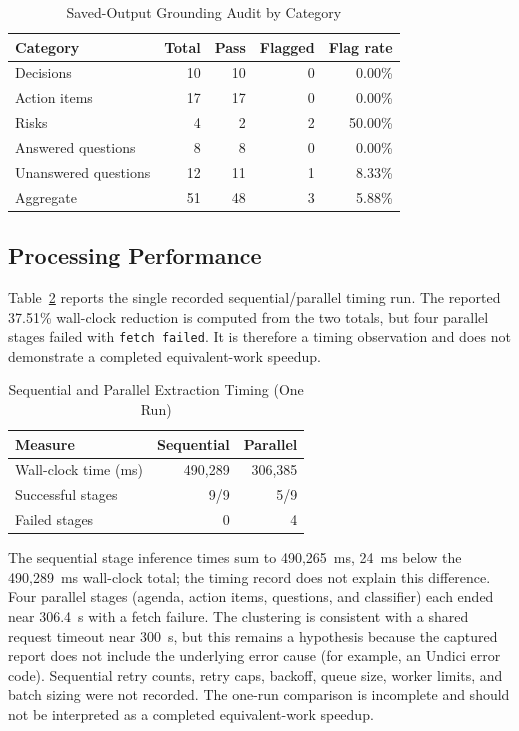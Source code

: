 \documentclass[conference]{IEEEtran}
\begin{document}
\begin{table}[t]
\caption{Saved-Output Grounding Audit by Category}
\label{tab:grounding_categories}
\centering
\footnotesize
\begin{tabular}{@{}lrrrr@{}}
\toprule
\textbf{Category} & \textbf{Total} & \textbf{Pass} & \textbf{Flagged} & \textbf{Flag rate} \\
\midrule
Decisions & 10 & 10 & 0 & 0.00\% \\
Action items & 17 & 17 & 0 & 0.00\% \\
Risks & 4 & 2 & 2 & 50.00\% \\
Answered questions & 8 & 8 & 0 & 0.00\% \\
Unanswered questions & 12 & 11 & 1 & 8.33\% \\
Aggregate & 51 & 48 & 3 & 5.88\% \\
\bottomrule
\end{tabular}
\end{table}

\subsection{Processing Performance}
Table~\ref{tab:latency} reports the single recorded sequential/parallel timing run. The reported 37.51\% wall-clock reduction is computed from the two totals, but four parallel stages failed with \texttt{fetch failed}. It is therefore a timing observation and does not demonstrate a completed equivalent-work speedup.

\begin{table}[t]
\caption{Sequential and Parallel Extraction Timing (One Run)}
\label{tab:latency}
\centering
\footnotesize
\begin{tabular}{@{}lrr@{}}
\toprule
\textbf{Measure} & \textbf{Sequential} & \textbf{Parallel} \\
\midrule
Wall-clock time (ms) & 490,289 & 306,385 \\
Successful stages & 9/9 & 5/9 \\
Failed stages & 0 & 4 \\
\bottomrule
\end{tabular}
\end{table}

The sequential stage inference times sum to 490,265~ms, 24~ms below the 490,289~ms wall-clock total; the timing record does not explain this difference. Four parallel stages (agenda, action items, questions, and classifier) each ended near 306.4~s with a fetch failure. The clustering is consistent with a shared request timeout near 300~s, but this remains a hypothesis because the captured report does not include the underlying error cause (for example, an Undici error code). Sequential retry counts, retry caps, backoff, queue size, worker limits, and batch sizing were not recorded. The one-run comparison is incomplete and should not be interpreted as a completed equivalent-work speedup.
\end{document}
